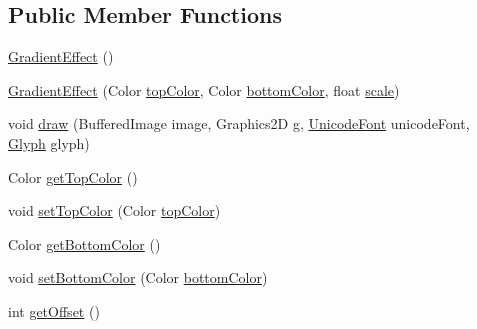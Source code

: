 \subsection*{Public Member Functions}
\begin{DoxyCompactItemize}
\item 
\mbox{\hyperlink{classorg_1_1newdawn_1_1slick_1_1font_1_1effects_1_1_gradient_effect_a1437721eb073f6f3e7ef6d17bab867dd}{Gradient\+Effect}} ()
\item 
\mbox{\hyperlink{classorg_1_1newdawn_1_1slick_1_1font_1_1effects_1_1_gradient_effect_a7440a48692276d7463c4171c2b8c2a0f}{Gradient\+Effect}} (Color \mbox{\hyperlink{classorg_1_1newdawn_1_1slick_1_1font_1_1effects_1_1_gradient_effect_abd381669fcbe81fae9c0fb7546d8089d}{top\+Color}}, Color \mbox{\hyperlink{classorg_1_1newdawn_1_1slick_1_1font_1_1effects_1_1_gradient_effect_afc1661928816b8210b1fe9d6f43c74c8}{bottom\+Color}}, float \mbox{\hyperlink{classorg_1_1newdawn_1_1slick_1_1font_1_1effects_1_1_gradient_effect_aa2b56ea1a52119215a041ac8328abcec}{scale}})
\item 
void \mbox{\hyperlink{classorg_1_1newdawn_1_1slick_1_1font_1_1effects_1_1_gradient_effect_ad5794e2cde6f964803b5010bdca3f070}{draw}} (Buffered\+Image image, Graphics2D g, \mbox{\hyperlink{classorg_1_1newdawn_1_1slick_1_1_unicode_font}{Unicode\+Font}} unicode\+Font, \mbox{\hyperlink{classorg_1_1newdawn_1_1slick_1_1font_1_1_glyph}{Glyph}} glyph)
\item 
Color \mbox{\hyperlink{classorg_1_1newdawn_1_1slick_1_1font_1_1effects_1_1_gradient_effect_af05cdc8a38d088444980823121386bfb}{get\+Top\+Color}} ()
\item 
void \mbox{\hyperlink{classorg_1_1newdawn_1_1slick_1_1font_1_1effects_1_1_gradient_effect_a3d206a5fccf9d93ca7a08c23b5bb1a2e}{set\+Top\+Color}} (Color \mbox{\hyperlink{classorg_1_1newdawn_1_1slick_1_1font_1_1effects_1_1_gradient_effect_abd381669fcbe81fae9c0fb7546d8089d}{top\+Color}})
\item 
Color \mbox{\hyperlink{classorg_1_1newdawn_1_1slick_1_1font_1_1effects_1_1_gradient_effect_ac5c262f812a3c69a5b4b5b9917174a78}{get\+Bottom\+Color}} ()
\item 
void \mbox{\hyperlink{classorg_1_1newdawn_1_1slick_1_1font_1_1effects_1_1_gradient_effect_a85d228fa2711d385fd5b571b10a32231}{set\+Bottom\+Color}} (Color \mbox{\hyperlink{classorg_1_1newdawn_1_1slick_1_1font_1_1effects_1_1_gradient_effect_afc1661928816b8210b1fe9d6f43c74c8}{bottom\+Color}})
\item 
int \mbox{\hyperlink{classorg_1_1newdawn_1_1slick_1_1font_1_1effects_1_1_gradient_effect_a7f6294f3f1e2f281f3db8ad6cf824359}{get\+Offset}} ()

\end{DoxyCompactItemize}
